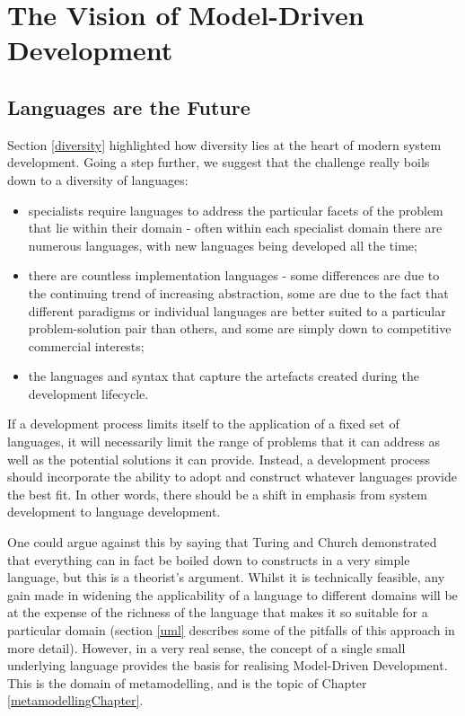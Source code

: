 

\section{The Vision of Model-Driven Development} \label{mddvision}

\subsection{Languages are the Future}

Section \ref{diversity} highlighted how diversity lies at the heart of modern system development. Going a step further, we suggest that the challenge really boils down to a diversity of languages:
\begin{itemize}
\item specialists require languages to address the particular facets of the problem that lie within their domain - often within each specialist domain there are numerous languages, with new languages being developed all the time;
\item there are countless implementation languages - some differences are due to the continuing trend of increasing abstraction, some are due to the fact that different paradigms or individual languages are better suited to a particular problem-solution pair than others, and some are simply down to competitive commercial interests;
\item the languages and syntax that capture the artefacts created during the development lifecycle.
\end{itemize}

If a development process limits itself to the application of a fixed set of languages, it will necessarily limit the range of problems that it can address as well as the potential solutions it can provide. Instead, a development process should incorporate the ability to adopt and construct whatever languages provide the best fit. In other words, there should be a shift in emphasis from system development to language development.

One could argue against this by saying that Turing and Church demonstrated that everything can in fact be boiled down to constructs in a very simple language, but this is a theorist's argument. Whilst it is technically feasible, any gain made in widening the applicability of a language to different domains will be at the expense of the richness of the language that makes it so suitable for a particular domain (section \ref{uml} describes some of the pitfalls of this approach in more detail). However, in a very real sense, the concept of a single small underlying language provides the basis for realising Model-Driven Development. This is the domain of metamodelling, and is the topic of Chapter \ref{metamodellingChapter}.

